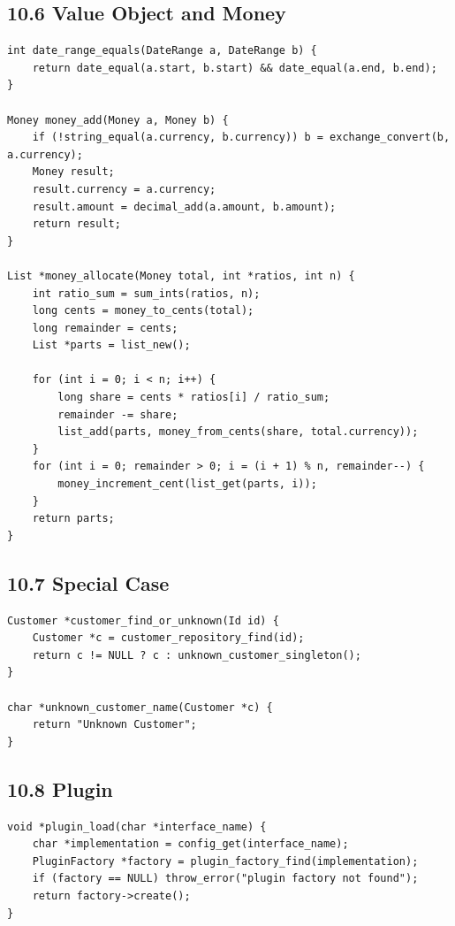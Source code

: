 \documentclass[11pt]{article}
\begin{document}
\subsection{10.6 Value Object and Money}\label{value-object-and-money}

\begin{verbatim}
int date_range_equals(DateRange a, DateRange b) {
    return date_equal(a.start, b.start) && date_equal(a.end, b.end);
}

Money money_add(Money a, Money b) {
    if (!string_equal(a.currency, b.currency)) b = exchange_convert(b, a.currency);
    Money result;
    result.currency = a.currency;
    result.amount = decimal_add(a.amount, b.amount);
    return result;
}

List *money_allocate(Money total, int *ratios, int n) {
    int ratio_sum = sum_ints(ratios, n);
    long cents = money_to_cents(total);
    long remainder = cents;
    List *parts = list_new();

    for (int i = 0; i < n; i++) {
        long share = cents * ratios[i] / ratio_sum;
        remainder -= share;
        list_add(parts, money_from_cents(share, total.currency));
    }
    for (int i = 0; remainder > 0; i = (i + 1) % n, remainder--) {
        money_increment_cent(list_get(parts, i));
    }
    return parts;
}
\end{verbatim}

\subsection{10.7 Special Case}\label{special-case}

\begin{verbatim}
Customer *customer_find_or_unknown(Id id) {
    Customer *c = customer_repository_find(id);
    return c != NULL ? c : unknown_customer_singleton();
}

char *unknown_customer_name(Customer *c) {
    return "Unknown Customer";
}
\end{verbatim}

\subsection{10.8 Plugin}\label{plugin}

\begin{verbatim}
void *plugin_load(char *interface_name) {
    char *implementation = config_get(interface_name);
    PluginFactory *factory = plugin_factory_find(implementation);
    if (factory == NULL) throw_error("plugin factory not found");
    return factory->create();
}
\end{verbatim}
\end{document}

